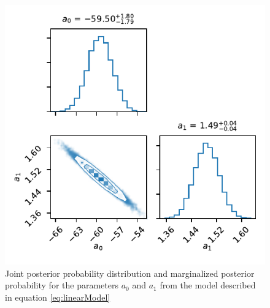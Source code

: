 \begin{figure}
    \centering
    \includegraphics{CodeAndFigures/LinearModelMetropolisHastings.pdf}
    \caption{Joint posterior probability distribution and marginalized posterior probability for the parameters $a_0$ and $a_1$ from the model described in equation \ref{eq:linearModel}}
    \label{fig:LinearHastings}
\end{figure}